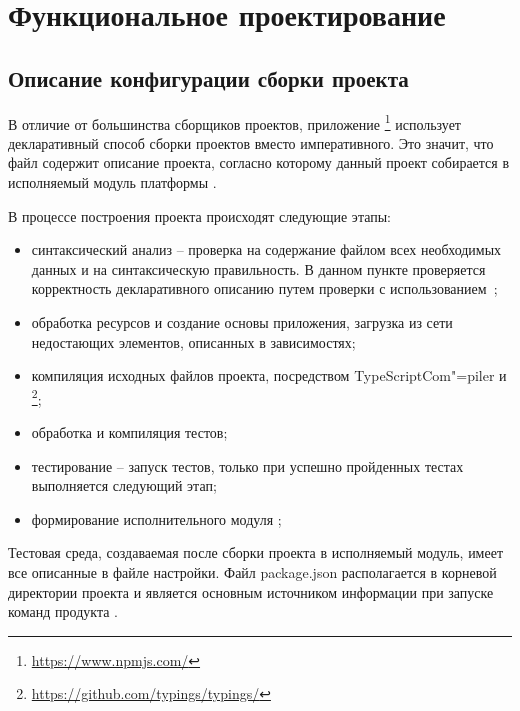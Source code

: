 \section{Функциональное проектирование} %
\label{sec:arch_and_mod}

\subsection{Описание конфигурации сборки проекта}
\label{sub:arch_and_mod:graphlib}

В отличие от большинства сборщиков проектов, приложение \npm{}\footnote{\url{https://www.npmjs.com/}} использует декларативный способ сборки проектов вместо императивного. Это значит, что \json{} файл содержит описание проекта, согласно которому данный проект собирается в исполняемый модуль платформы \nodejs{}.

В процессе построения проекта происходят следующие этапы:
\begin{itemize}
  \item синтаксический анализ – проверка на содержание файлом всех необходимых данных и на синтаксическую правильность. В данном пункте проверяется корректность декларативного описанию путем проверки с использованием \npmrc{};
  \item обработка ресурсов и создание основы приложения, загрузка из сети недостающих элементов, описанных в зависимостях;
  \item компиляция исходных файлов проекта, посредством TypeScriptCom"=piler и \typings{}\footnote{\url{https://github.com/typings/typings/}};
  \item обработка и компиляция тестов;
  \item тестирование – запуск тестов, только при успешно пройденных тестах выполняется следующий этап;
  \item формирование исполнительного модуля \nodejs{};
\end{itemize}

Тестовая среда, создаваемая после сборки проекта в исполняемый модуль, имеет все описанные в \json{} файле настройки. Файл package.json располагается в корневой директории проекта и является основным источником информации при запуске команд продукта \npm{}.

